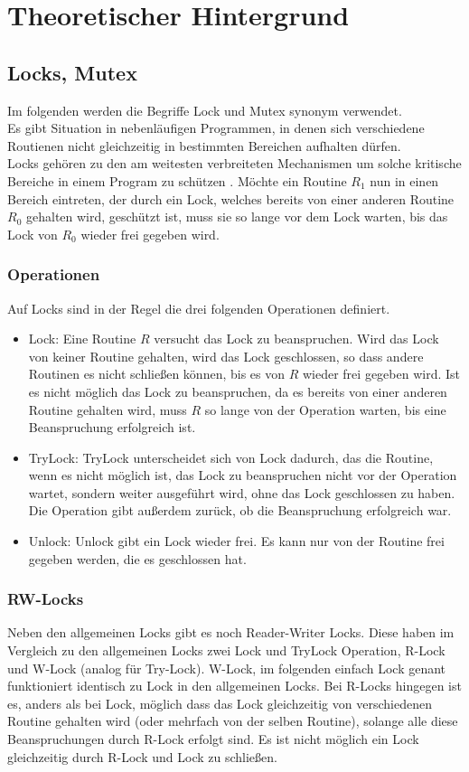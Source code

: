 \chapter{Theoretischer Hintergrund}

\section{Locks, Mutex}
Im folgenden werden die Begriffe Lock und Mutex synonym verwendet.\\
Es gibt Situation in nebenläufigen Programmen, in denen sich verschiedene 
Routienen nicht gleichzeitig in bestimmten Bereichen aufhalten dürfen.\\
Locks gehören zu den am weitesten verbreiteten Mechanismen um solche kritische 
Bereiche in einem Program zu schützen \cite{zhou}.
Möchte ein Routine $R_1$ nun in einen Bereich 
eintreten, der durch ein Lock, welches bereits von einer anderen Routine $R_0$ 
gehalten wird, geschützt ist, muss sie so lange vor dem Lock warten, bis das Lock 
von $R_0$ wieder frei gegeben wird.
\subsection{Operationen}
Auf Locks sind in der Regel die drei folgenden Operationen definiert.
\begin{itemize}
    \item Lock: Eine Routine $R$ versucht das Lock zu beanspruchen. Wird das Lock 
        von keiner Routine gehalten, wird das Lock geschlossen, so dass andere 
        Routinen es nicht schließen können, bis es von $R$ wieder frei gegeben 
        wird. Ist es nicht möglich das Lock zu beanspruchen, da es bereits von 
        einer anderen Routine gehalten wird, muss $R$ so lange von der Operation 
        warten, bis eine Beanspruchung erfolgreich ist.
    \item TryLock: TryLock unterscheidet sich von Lock dadurch, das die Routine,
        wenn es nicht möglich ist, das Lock zu beanspruchen nicht vor der 
        Operation wartet, sondern weiter ausgeführt wird, ohne das Lock geschlossen
        zu haben. Die Operation gibt außerdem zurück, ob die Beanspruchung 
        erfolgreich war.
    \item Unlock: Unlock gibt ein Lock wieder frei. Es kann nur von der Routine 
        frei gegeben werden, die es geschlossen hat.
\end{itemize}
\subsection{RW-Locks}
Neben den allgemeinen Locks gibt es noch Reader-Writer Locks. Diese haben im 
Vergleich zu den allgemeinen Locks zwei Lock und TryLock Operation, R-Lock und 
W-Lock (analog für Try-Lock). W-Lock, im folgenden einfach Lock genant funktioniert 
identisch zu Lock in den allgemeinen Locks. Bei R-Locks hingegen ist es, anders 
als bei Lock, möglich dass das Lock gleichzeitig von verschiedenen Routine gehalten wird
(oder mehrfach von der selben Routine), solange alle diese Beanspruchungen durch 
R-Lock erfolgt sind. Es ist nicht möglich ein Lock gleichzeitig durch R-Lock und 
Lock zu schließen.

